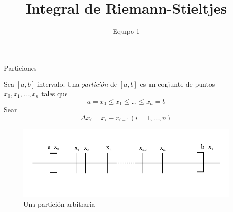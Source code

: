 \documentclass[10pt]{beamer}
\author{Equipo 1}
\title{Integral de Riemann-Stieltjes}
\institute{Facultad de Matemáticas UV}
\begin{document}
\begin{frame}
\titlepage
\end{frame}


\begin{frame}[allowframebreaks]{Particiones}

\begin{definition}
Sea $[a, b]$ intervalo. Una \textit{partición} de $[a, b]$ es un conjunto de puntos $x_0, x_1,..., x_n$ tales que
\[
	a = x_0 \leq x_1 \leq \dots \leq x_n = b
\]
Sean
\[
	\Delta x_i = x_i - x_{i-1} (i = 1, \dots, n)
\]
\end{definition}

\begin{figure}
	\includegraphics[width=\textwidth]{img/particion.png}
	\caption{Una partición arbitraria}
\end{figure}

\end{frame}
\end{document}
